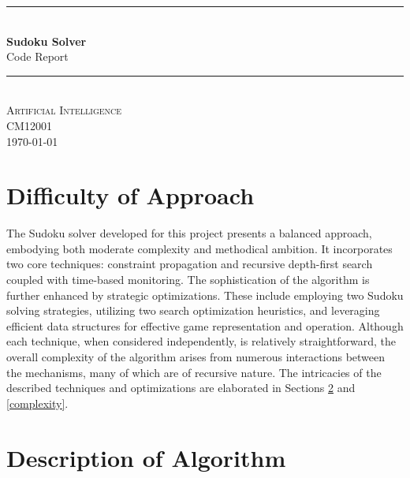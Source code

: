 \documentclass[12pt]{article}
\newcommand{\HRule}{\rule{\linewidth}{0.5mm}}
\begin{document}
\begin{titlepage}
    \centering
    \HRule \\[0.4cm]
    \vspace{0.5cm}
    {\Huge \bfseries Sudoku Solver}\\[0.5cm]
    {\Large Code Report}\\[0.4cm]
    \HRule \\[1.5cm]
    
    \textsc{\Large Artificial Intelligence}\\[0.5cm]
    \textsc{CM12001}\\[2cm]
    
    {\large \today}\\[3cm]

\end{titlepage}

\thispagestyle{fancy}

\section{Difficulty of Approach}
\label{difficulty}

The Sudoku solver developed for this project presents a balanced approach,
embodying both moderate complexity and methodical ambition. It incorporates two
core techniques: constraint propagation and recursive depth-first search
coupled with time-based monitoring. The sophistication of the algorithm is
further enhanced by strategic optimizations. These include employing two Sudoku
solving strategies, utilizing two search optimization heuristics, and
leveraging efficient data structures for effective game representation and
operation. Although each technique, when considered independently, is
relatively straightforward, the overall complexity of the algorithm arises from
numerous interactions between the mechanisms, many of which are of recursive
nature. The intricacies of the described techniques and optimizations are
elaborated in Sections \ref{description} and \ref{complexity}.

\section{Description of Algorithm}
\label{description}
\end{document}
